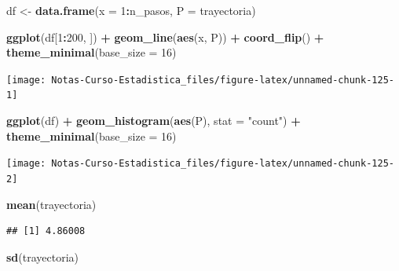 \documentclass[
  12pt,
]{book}
\newenvironment{Shaded}{\begin{snugshade}}{\end{snugshade}}
\newcommand{\DataTypeTok}[1]{\textcolor[rgb]{0.13,0.29,0.53}{#1}}
\newcommand{\DecValTok}[1]{\textcolor[rgb]{0.00,0.00,0.81}{#1}}
\newcommand{\KeywordTok}[1]{\textcolor[rgb]{0.13,0.29,0.53}{\textbf{#1}}}
\newcommand{\NormalTok}[1]{#1}
\newcommand{\OperatorTok}[1]{\textcolor[rgb]{0.81,0.36,0.00}{\textbf{#1}}}
\newcommand{\StringTok}[1]{\textcolor[rgb]{0.31,0.60,0.02}{#1}}
\theoremstyle{definition}
\theoremstyle{definition}
\theoremstyle{definition}
\theoremstyle{remark}
\begin{document}
\begin{Shaded}
\begin{Highlighting}[]
\NormalTok{df <-}\StringTok{ }\KeywordTok{data.frame}\NormalTok{(}\DataTypeTok{x =} \DecValTok{1}\OperatorTok{:}\NormalTok{n_pasos, }\DataTypeTok{P =}\NormalTok{ trayectoria)}

\KeywordTok{ggplot}\NormalTok{(df[}\DecValTok{1}\OperatorTok{:}\DecValTok{200}\NormalTok{, ]) }\OperatorTok{+}\StringTok{ }\KeywordTok{geom_line}\NormalTok{(}\KeywordTok{aes}\NormalTok{(x, P)) }\OperatorTok{+}\StringTok{ }\KeywordTok{coord_flip}\NormalTok{() }\OperatorTok{+}\StringTok{ }
\StringTok{    }\KeywordTok{theme_minimal}\NormalTok{(}\DataTypeTok{base_size =} \DecValTok{16}\NormalTok{)}
\end{Highlighting}
\end{Shaded}

\begin{center}\texttt{[image: Notas-Curso-Estadistica\_files/figure-latex/unnamed-chunk-125-1]} \end{center}

\begin{Shaded}
\begin{Highlighting}[]
\KeywordTok{ggplot}\NormalTok{(df) }\OperatorTok{+}\StringTok{ }\KeywordTok{geom_histogram}\NormalTok{(}\KeywordTok{aes}\NormalTok{(P), }\DataTypeTok{stat =} \StringTok{"count"}\NormalTok{) }\OperatorTok{+}\StringTok{ }
\StringTok{    }\KeywordTok{theme_minimal}\NormalTok{(}\DataTypeTok{base_size =} \DecValTok{16}\NormalTok{)}
\end{Highlighting}
\end{Shaded}

\begin{center}\texttt{[image: Notas-Curso-Estadistica\_files/figure-latex/unnamed-chunk-125-2]} \end{center}

\begin{Shaded}
\begin{Highlighting}[]
\KeywordTok{mean}\NormalTok{(trayectoria)}
\end{Highlighting}
\end{Shaded}

\begin{verbatim}
## [1] 4.86008
\end{verbatim}

\begin{Shaded}
\begin{Highlighting}[]
\KeywordTok{sd}\NormalTok{(trayectoria)}
\end{Highlighting}
\end{Shaded}
\end{document}
